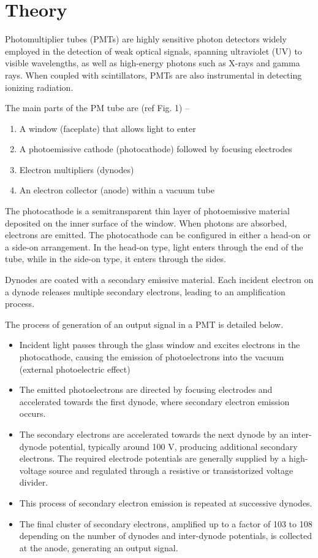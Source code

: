 \section{Theory}
Photomultiplier tubes (PMTs) are highly sensitive photon detectors widely employed in the detection of weak optical signals, spanning ultraviolet (UV) to visible wavelengths, as well as high-energy photons such as X-rays and gamma rays. When coupled with scintillators, PMTs are also instrumental in detecting ionizing radiation. 


The main parts of the PM tube are (ref Fig. 1) -- 
\begin{enumerate}
    \item A window (faceplate) that allows light to enter
    \item A photoemissive cathode (photocathode) followed by focusing electrodes
    \item Electron multipliers (dynodes)
    \item An electron collector (anode) within a vacuum
    tube
\end{enumerate}

The photocathode is a semitransparent thin layer of photoemissive material deposited on the inner surface of the window. When photons are absorbed, electrons are emitted. The photocathode can be configured in either a head-on or a side-on arrangement. In the head-on type, light enters through the end of the tube, while in the side-on type, it enters through the sides.

Dynodes are coated with a secondary emissive material. Each incident electron on a dynode releases multiple secondary electrons, leading to an amplification process.

The process of generation of an output signal in a PMT is detailed below.

\begin{itemize}
    \item Incident light passes through the glass window and excites electrons in the photocathode, causing the emission of photoelectrons into the vacuum (external photoelectric effect)
    \item The emitted photoelectrons are directed by focusing electrodes and accelerated towards the first dynode, where secondary electron emission occurs.
    \item The secondary electrons are accelerated towards the next dynode by an inter-dynode potential, typically around 100 V, producing additional secondary electrons. The required electrode potentials are generally supplied by a high-voltage source and regulated through a resistive or transistorized voltage divider.
    \item This process of secondary electron emission is repeated at successive dynodes.
    \item The final cluster of secondary electrons, amplified up to a factor of 103 to 108 depending on the number of dynodes and inter-dynode potentials, is collected at the anode, generating an output signal.
\end{itemize}

